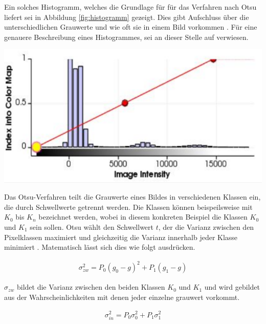 \begin{minipage}{0.40\textwidth}
	Ein solches Histogramm, welches die Grundlage für für das Verfahren nach Otsu
	liefert sei in Abbildung \ref{fig:histogramm} gezeigt. Dies gibt Aufschluss über
	die unterschiedlichen Grauwerte und wie oft sie in einem Bild vorkommen \citep[vgl.][Seite264]{lehmann2013bildverarbeitung}.
	Für eine genauere Beschreibung eines Histogrammes, sei an dieser Stelle auf \citet[Seite42]{burger2009}
	verwiesen.
\end{minipage}
\hfill
\begin{minipage}{0.50\textwidth}
	\centering
	\includegraphics[width=1\textwidth]{img/histogramm.jpg}
	 \label{fig:histogramm}
\end{minipage}

Das Otsu-Verfahren teilt die Grauwerte eines Bildes in verschiedenen Klassen ein,
die durch Schwellwerte getrennt werden. Die Klassen können beispeilsweise mit
$K_{0}$ bis $K_{n}$ bezeichnet werden, wobei in diesem konkreten Beispiel die Klassen
$K_{0}$ und $K_{1}$ sein sollen. Otsu wählt den Schwellwert $t$, der die Varianz
zwischen den Pixelklassen maximiert und gleichzeitig die Varianz innerhalb jeder
Klasse minimiert \citep[vgl.][Seite264]{lehmann2013bildverarbeitung}.
Matematisch lässt sich dies wie folgt ausdrücken.

\begin{align}
	\sigma_{zw}^{2}= P_{0}(g_{0}- g)^{2}+ P_{1}(g_{1}- g)
\end{align}

$\sigma_{zw}$ bildet die Varianz zwischen den beiden Klassen $K_{0}$ und $K_{1}$
und wird gebildet aus der Wahrscheinlichkeiten mit denen jeder einzelne grauwert
vorkommt.

\begin{align}
	\sigma_{in}^{2}= P_{0}\sigma_{0}^{2}+ P_{1}\sigma_{1}^{2}
\end{align}

